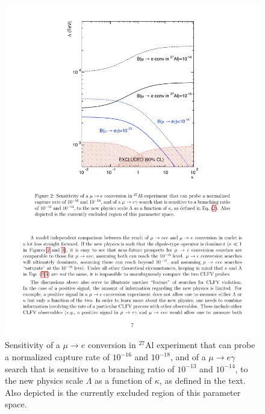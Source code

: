 \documentclass{tcibook}
\begin{document}
\begin{figure}[ht]
\begin{minipage}[b]{0.48\linewidth}
\centering
\includegraphics[trim = 45mm 130mm 50mm 10mm, clip, width=\linewidth]{Page7.pdf}
  \caption{{Sensitivity of a $\mu\to e$ conversion in $^{27}$Al experiment that can probe a normalized capture 
rate of $10^{−16}$ and $10^{−18}$, and of a $\mu \to e \gamma$ search that is sensitive to a branching ratio of $10^{−13}$ and 
$10^{−14}$, to the new physics scale $\Lambda$ as a function of $\kappa$, as defined in the text. Also depicted is the 
currently excluded region of this parameter space.
}}
\label{fig:cl:p7}
\end{minipage}
\hspace{0.3cm}
\begin{minipage}[b]{0.48\linewidth}
\centering

\end{minipage}
\end{figure}
\end{document}
